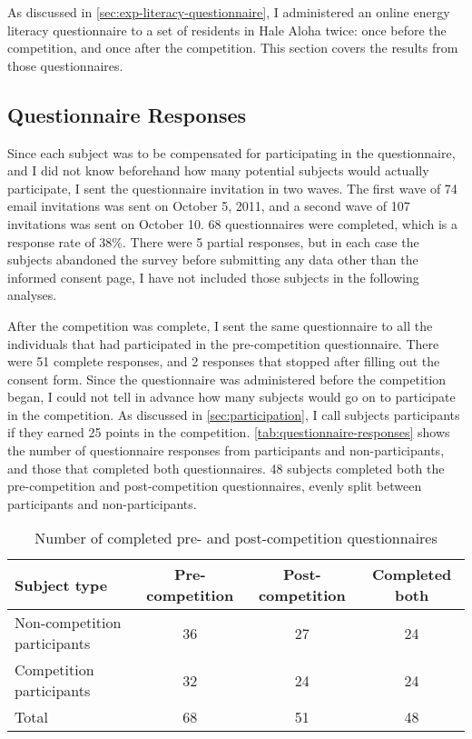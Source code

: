 As discussed in \autoref{sec:exp-literacy-questionnaire}, I administered an online energy literacy questionnaire to a set of residents in Hale Aloha twice: once before the competition, and once after the competition. This section covers the results from those questionnaires.

\subsection{Questionnaire Responses}

Since each subject was to be compensated for participating in the questionnaire, and I did not know beforehand how many potential subjects would actually participate, I sent the questionnaire invitation in two waves. The first wave of 74 email invitations was sent on October 5, 2011, and a second wave of 107 invitations was sent on October 10. 68 questionnaires were completed, which is a response rate of 38\%. There were 5 partial responses, but in each case the subjects abandoned the survey before submitting any data other than the informed consent page, I have not included those subjects in the following analyses.

After the competition was complete, I sent the same questionnaire to all the individuals that had participated in the pre-competition questionnaire. There were 51 complete responses, and 2 responses that stopped after filling out the consent form. Since the questionnaire was administered before the competition began, I could not tell in advance how many subjects would go on to participate in the competition. As discussed in \autoref{sec:participation}, I call subjects participants if they earned 25 points in the competition. \autoref{tab:questionnaire-responses} shows the number of questionnaire responses from participants and non-participants, and those that completed both questionnaires. 48 subjects completed both the pre-competition and post-competition questionnaires, evenly split between participants and non-participants.

\begin{table}[htbp]
	\centering
		\begin{tabular}{| l | c | c | c |}
			\hline
			Subject type & Pre-competition & Post-competition & Completed both \tabularnewline \hline \hline
			Non-competition participants & 36 & 27 & 24 \tabularnewline \hline
			Competition participants & 32 & 24 & 24 \tabularnewline \hline \hline
			Total & 68 & 51 & 48 \tabularnewline \hline
		\end{tabular}
	\caption{Number of completed pre- and post-competition questionnaires}
\label{tab:questionnaire-responses}
\end{table}



